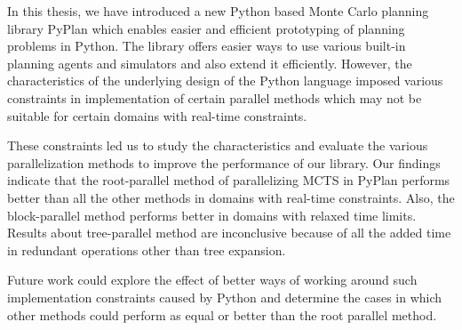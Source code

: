 \documentclass[double,12pt]{beavtex}
\begin{document}
In this thesis, we have introduced a new Python based Monte Carlo planning library PyPlan which enables easier and efficient prototyping of planning problems in Python. The library offers easier ways to use various built-in planning agents and simulators and also extend it efficiently. However, the characteristics of the underlying design of the Python language imposed various constraints in implementation of certain parallel methods which may not be suitable for certain domains with real-time constraints. 

These constraints led us to study the characteristics and evaluate the various parallelization methods to improve the performance of our library. Our findings indicate that the root-parallel method of parallelizing MCTS in PyPlan performs better than all the other methods in domains with real-time constraints. Also, the block-parallel method performs better in domains with relaxed time limits. Results about tree-parallel method are inconclusive because of all the added time in redundant operations other than tree expansion. 

Future work could explore the effect of better ways of working around such implementation constraints caused by Python and determine the cases in which other methods could perform as equal or better than the root parallel method.



\end{document}
